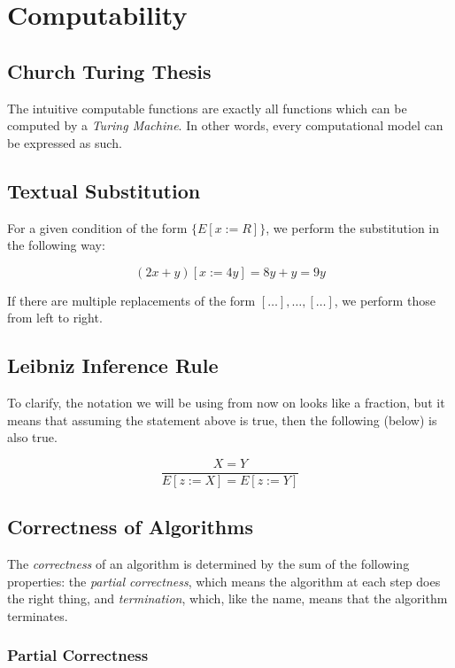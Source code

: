 \chapter{Computability}

\section{Church Turing Thesis}

The intuitive computable functions are exactly all functions which can be computed 
by a \emph{Turing Machine}. In other words, every computational model can be expressed as such.

\section{Textual Substitution}

For a given condition of the form \(\{E[x:=R]\}\), we perform the substitution in the following way:

\[
    (2x + y)[x:= 4y] = 8y + y = 9y
\]

If there are multiple replacements of the form \([\dots], \dots, [\dots]\), we perform those from left to right.

\section{Leibniz Inference Rule}

To clarify, the notation we will be using from now on looks like a fraction, but it means that assuming 
the statement above is true, then the following (below) is also true. 

\[
    \frac{X = Y}{E[z:=X] = E[z:= Y]} 
\]

\section{Correctness of Algorithms}

The \emph{correctness} of an algorithm is determined by the sum of the following properties: 
the \emph{partial correctness}, which means the algorithm at each step does the right thing, and 
\emph{termination}, which, like the name, means that the algorithm terminates. 

\subsection{Partial Correctness}

